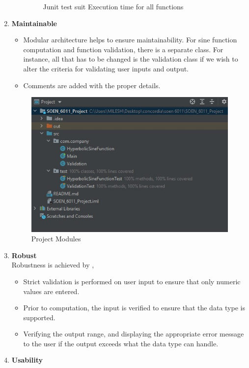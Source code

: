 \documentclass[
	12pt
]{article}
\begin{document}
\begin{enumerate}
\begin{itemize}
\begin{figure}[htp]
    \caption{ Junit test suit Execution time for all functions}
    \label{Execution time for all functions}
\end{figure}
\end{itemize}\newpage
\item \textbf{Maintainable}
\begin{itemize}
    \item Modular architecture helps to ensure maintainability.
For sine function computation and function validation, there is a separate class. For instance, all that has to be changed is the validation class if we wish to alter the criteria for validating user inputs and output.
\item Comments are added with the proper details.
\end{itemize}
 \begin{figure}[htp]
    \centering
    \includegraphics[width=12cm]{module.jpg}
    \caption{ Project Modules}
    \label{Project Modules}
\end{figure}
\item \textbf{Robust}\\
Robustness is achieved by ,
\begin{itemize}
    \item Strict validation is performed on user input to ensure that only numeric values are entered.
    \item Prior to computation, the input is verified to ensure that the data type is supported.
    \item Verifying the output range, and displaying the appropriate error message to the user if the output exceeds what the data type can handle.\\
\end{itemize}
\item \textbf{Usability}

\end{enumerate}
\end{document}
